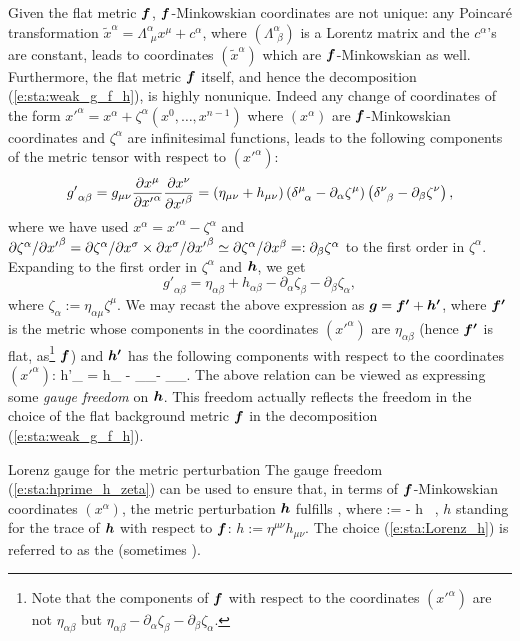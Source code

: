 Given the flat metric $\bm{f}$, $\bm{f}$-Minkowskian coordinates
are not unique: any Poincaré transformation\label{p:sta:Poincare_transf}
${\tilde x}^\alpha = \Lambda^\alpha_{\ \, \mu} x^\mu + c^\alpha$, where
$(\Lambda^\alpha_{\ \, \beta})$ is a Lorentz matrix and the $c^\alpha$'s are
constant, leads to coordinates $({\tilde x}^\alpha)$ which are
$\bm{f}$-Minkowskian as well.
Furthermore, the flat metric $\bm{f}$ itself, and hence the decomposition (\ref{e:sta:weak_g_f_h}), is
highly nonunique.
Indeed any change of coordinates of the form ${x'}^\alpha = x^\alpha + \zeta^\alpha(x^0,\ldots,x^{n-1})$
where $(x^\alpha)$ are $\bm{f}$-Minkowskian coordinates and $\zeta^\alpha$ are infinitesimal functions,
leads to the following components of the metric tensor with respect to $({x'}^\alpha)$:
\[
    {g'}_{\alpha\beta} = g_{\mu\nu} \frac{\partial x^\mu}{\partial {x'}^\alpha} \frac{\partial x^\nu}{\partial {x'}^\beta}
    = \left( \eta_{\mu\nu} + h_{\mu\nu}\right) \left( \delta^\mu_{\ \, \alpha} - \partial_\alpha \zeta^\mu \right)
     \left( \delta^\nu_{\ \, \beta} - \partial_\beta \zeta^\nu \right) ,
\]
where we have used $x^\alpha = {x'}^\alpha - \zeta^\alpha$
and ${\partial \zeta^\alpha}/{\partial {x'}^\beta} = {\partial \zeta^\alpha}/{\partial x^\sigma} \times {\partial x^\sigma}/{\partial {x'}^\beta} \simeq
{\partial \zeta^\alpha}/{\partial x^\beta} =: \partial_\beta \zeta^\alpha$ to the first order in $\zeta^\alpha$.
Expanding to the first order in $\zeta^\alpha$ and $\bm{h}$, we get
\[
    {g'}_{\alpha\beta}  = \eta_{\alpha\beta} + h_{\alpha\beta}
    - \partial_\alpha \zeta_\beta - \partial_\beta \zeta_\alpha ,
\]
where $\zeta_\alpha := \eta_{\alpha\mu} \zeta^\mu$.
We may recast the above expression as
$\bm{g} = \bm{f'} + \bm{h'}$,
where $\bm{f'}$ is the metric whose components in the coordinates $({x'}^\alpha)$ are
$\eta_{\alpha\beta}$ (hence $\bm{f'}$ is flat, as\footnote{Note that
the components of $\bm{f}$ with respect to the coordinates $({x'}^\alpha)$ are not $\eta_{\alpha\beta}$
but $\eta_{\alpha\beta} - \partial_\alpha \zeta_\beta - \partial_\beta \zeta_\alpha$.} $\bm{f}$)
and $\bm{h'}$ has the following components with respect to the coordinates $({x'}^\alpha)$:
\be \label{e:sta:hprime_h_zeta}
    {h'}_{\alpha\beta} = h_{\alpha\beta} - \partial_\alpha \zeta_\beta - \partial_\beta \zeta_\alpha .
\ee
The above relation can be viewed as expressing some \emph{gauge freedom} on
$\bm{h}$. This freedom actually reflects the freedom in the choice of the flat background metric $\bm{f}$ in the
decomposition (\ref{e:sta:weak_g_f_h}).

\begin{tprop}{Lorenz gauge for the metric perturbation}{}
The gauge freedom (\ref{e:sta:hprime_h_zeta}) can be used
to ensure that, in terms of $\bm{f}$-Minkowskian coordinates $(x^\alpha)$,
the metric perturbation $\bm{h}$ fulfills
\be \label{e:sta:Lorenz_h}
    ,
\ee
where
\be \label{e:sta:def_h_bar}
     :=  -  h \,  ,
\ee
$h$ standing for the trace of $\bm{h}$ with respect
to $\bm{f}$: $h := \eta^{\mu\nu} h_{\mu\nu}$.
The choice (\ref{e:sta:Lorenz_h}) is referred to as the
 (sometimes
 \cite{Strau13}).
\end{tprop}

